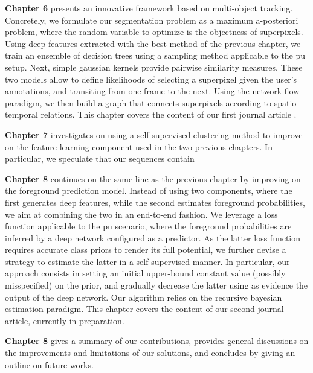 \textbf{Chapter 6} presents an innovative framework based on multi-object tracking.
Concretely, we formulate our segmentation problem as a maximum a-posteriori problem, where the random variable to optimize is the objectness of superpixels.
Using deep features extracted with the best method of the previous chapter, we train an ensemble of decision trees using a sampling method applicable to the \gls{pu} setup.
Next, simple gaussian kernels provide pairwise similarity measures.
These two models allow to define likelihoods of selecting a superpixel given the user's annotations, and transiting from one frame to the next.
Using the network flow paradigm, we then build a graph that connects superpixels according to spatio-temporal relations.
This chapter covers the content of our first journal article \cite{lejeune18}.

\textbf{Chapter 7} investigates on using a self-supervised clustering method to improve on the feature learning component used in the two previous chapters.
In particular, we speculate that our sequences contain

\textbf{Chapter 8} continues on the same line as the previous chapter by improving on the foreground prediction model.
Instead of using two components, where the first generates deep features, while the second estimates foreground probabilities, we aim at combining the two in an end-to-end fashion.
We leverage a loss function applicable to the \gls{pu} scenario, where the foreground probabilities are inferred by a deep network configured as a predictor.
As the latter loss function requires accurate class priors to render its full potential, we further devise a strategy to estimate the latter in a self-supervised manner.
In particular, our approach consists in setting an initial upper-bound constant value (possibly misspecified) on the prior, and gradually decrease the latter using as evidence the output of the deep network.
Our algorithm relies on the recursive bayesian estimation paradigm.
This chapter covers the content of our second journal article, currently in preparation.

\textbf{Chapter 8} gives a summary of our contributions, provides general discussions on the improvements and limitations of our solutions, and concludes by giving an outline on future works.

